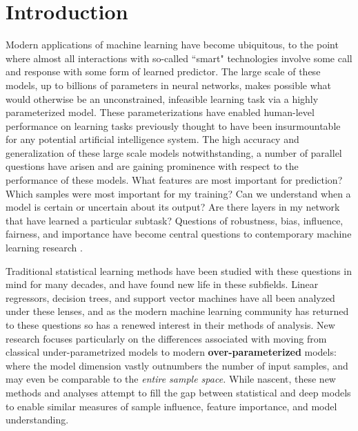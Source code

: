 \chapter{Introduction} \label{chap:intro} 

Modern applications of machine learning have become ubiquitous, 
to the point where almost all
interactions with so-called ``smart"
technologies involve some
call and response with some form of
learned predictor.
The large scale of these models,
up to billions of parameters in neural networks,
makes possible what would otherwise
be an unconstrained, infeasible learning task
via a highly parameterized model.
These parameterizations have enabled 
human-level performance on learning tasks
previously thought to have been insurmountable
for any potential artificial intelligence system.
The high accuracy and generalization of these large scale models notwithstanding,
a number of parallel questions have arisen and are gaining prominence with respect to 
the performance of these models.
What features are most important for prediction?
Which samples were most important for my training?
Can we understand when a model is certain or uncertain about its output?
Are there layers in my network that have learned a particular subtask?
Questions of robustness, bias, influence, fairness, and importance have become central questions to contemporary machine learning research \citep{doshi2017towards,mehrabi2021survey,amodei2016concrete}.

Traditional statistical learning methods 
have been studied with these questions in mind for many decades, and have found new life in these subfields.
Linear regressors, decision trees, and support vector machines
have all been analyzed under these lenses,
and as the modern machine learning community
has returned to these questions
so has a renewed interest in their methods of analysis.
New research focuses
particularly on the differences
associated with moving from classical under-parametrized models to
modern \textbf{over-parameterized} models: where
the model dimension vastly outnumbers the number
of input samples, and may even be comparable to 
the \textit{entire sample space.}
While nascent, these new methods and analyses
attempt to fill the gap between
statistical and deep models to enable similar measures of sample influence, feature importance, and model understanding. 


